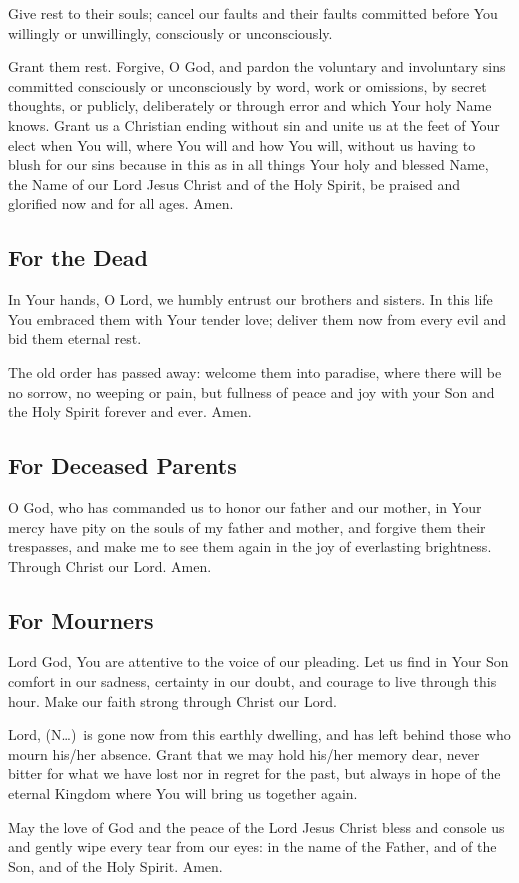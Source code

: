 \documentclass[12pt]{article}
\newcommand{\prayertitle}[1]{\subsection{#1}}
\newcommand{\insertname}{(N\dots)}
\begin{document}
Give rest to their souls;
cancel our faults and their faults committed before You willingly or unwillingly, consciously or unconsciously.

Grant them rest.
Forgive, O God, and pardon the voluntary and involuntary sins committed consciously or unconsciously by word, work or omissions, by secret thoughts, or publicly, deliberately or through error and which Your holy Name knows.
Grant us a Christian ending without sin and unite us at the feet of Your elect when You will, where You will and how You will, without us having to blush for our sins because in this as in all things Your holy and blessed Name, the Name of our Lord Jesus Christ and of the Holy Spirit, be praised and glorified now and for all ages. Amen.

\prayertitle{For the Dead}
In Your hands, O Lord, we humbly entrust our brothers and sisters.
In this life You embraced them with Your tender love;
deliver them now from every evil and bid them eternal rest.

The old order has passed away:
welcome them into paradise, where there will be no sorrow, no weeping or pain,
but fullness of peace and joy with your Son and the Holy Spirit forever and ever.
Amen.

\prayertitle{For Deceased Parents}
O God, who has commanded us to honor our father and our mother, in Your mercy have pity on the souls of my father and mother, and forgive them their trespasses, and make me to see them again in the joy of everlasting brightness. Through Christ our Lord. Amen.

\prayertitle{For Mourners}
Lord God, You are attentive to the voice of our pleading.
Let us find in Your Son comfort in our sadness, certainty in our doubt, and courage to live through this hour.
Make our faith strong through Christ our Lord.

Lord, \insertname\ is gone now from this earthly dwelling, and has left behind those who mourn his/her absence.
Grant that we may hold his/her memory dear, never bitter for what we have lost
nor in regret for the past, but always in hope of the eternal Kingdom where You will bring us together again.

May the love of God and the peace of the Lord Jesus Christ bless and console us and gently wipe every tear from our eyes:
in the name of the Father, and of the Son, and of the Holy Spirit.
Amen.
\end{document}
